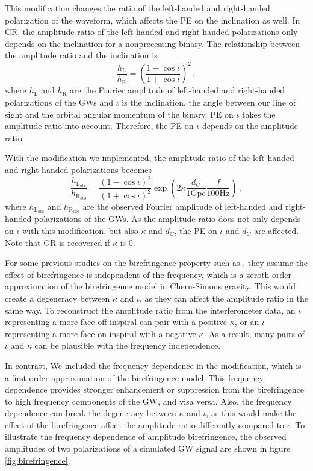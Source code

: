 \documentclass[reprint,amsmath,amssymb,aps,twocolumn]{aastex631}
\begin{document}
This modification changes the ratio of the left-handed and right-handed polarization of the waveform, which affects the PE on the inclination as well.
In GR, the amplitude ratio of the left-handed and right-handed polarizations only depends on the inclination for a nonprecessing binary.
The relationship between the amplitude ratio and the inclination is
\begin{equation}
    \frac{h_\mathrm{L}}{h_\mathrm{R}}=\left(\frac{1-\cos\iota}{1+\cos\iota}\right)^2\,,
\end{equation}
where $h_\mathrm{L}$ and $h_\mathrm{R}$ are the Fourier amplitude of left-handed and right-handed polarizations of the GWs and $\iota$ is the inclination, the angle between our line of sight and the orbital angular momentum of the binary.
PE on $\iota$ takes the amplitude ratio into account. Therefore, the PE on $\iota$ depends on the amplitude ratio.

With the modification we implemented, the amplitude ratio of the left-handed and right-handed polarizations becomes 
\begin{equation}
    \frac{h_\mathrm{L_{obs}}}{h_\mathrm{R_{obs}}}=\frac{\left(1-\cos\iota\right)^2}{\left(1+\cos\iota\right)^2}\exp\left({2\kappa\frac{d_C}{1\mathrm{Gpc}}\frac{f}{100\mathrm{Hz}}}\right)\,,
\end{equation}
where $h_\mathrm{L_{obs}}$ and $h_\mathrm{R_{obs}}$ are the observed Fourier amplitude of left-handed and right-handed polarizations of the GWs.
As the amplitude ratio does not only depends on $\iota$ with this modification, but also $\kappa$ and $d_C$, the PE on $\iota$ and $d_C$ are affected. Note that GR is recovered if $\kappa$ is $0$.

For some previous studies on the birefringence property such as \citet{Maria_2021}, they assume the effect of birefringence is independent of the frequency, which is a zeroth-order approximation of the birefringence model in Chern-Simons gravity.
This would create a degeneracy between $\kappa$ and $\iota$, as they can affect the amplitude ratio in the same way.
To reconstruct the amplitude ratio from the interferometer data, an $\iota$ representing a more face-off inspiral can pair with a positive $\kappa$, or an $\iota$ representing a more face-on inspiral with a negative $\kappa$.
As a result, many pairs of $\iota$ and $\kappa$ can be plausible with the frequency independence.

In contrast, We included the frequency dependence in the modification, which is a first-order approximation of the birefringence model.
This frequency dependence provides stronger enhancement or suppression from the birefringence to high frequency components of the GW, and visa versa.
Also, the frequency dependence can break the degeneracy between $\kappa$ and $\iota$, as this would make the effect of the birefringence affect the amplitude ratio differently compared to $\iota$.
To illustrate the frequency dependence of amplitude birefringence, the observed amplitudes of two polarizations of a simulated GW signal are shown in figure \ref{fig:birefringence}.
\end{document}
